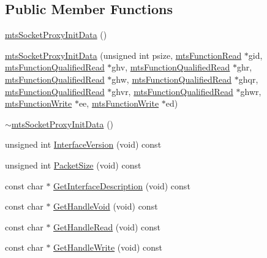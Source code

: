 \subsection*{Public Member Functions}
\begin{DoxyCompactItemize}
\item 
\hyperlink{classmts_socket_proxy_init_data_a0fa824a91dbd7cdf2aad73ef02278b48}{mts\+Socket\+Proxy\+Init\+Data} ()
\item 
\hyperlink{classmts_socket_proxy_init_data_ab4f9383394c2cf8bdf6044dda0af7242}{mts\+Socket\+Proxy\+Init\+Data} (unsigned int psize, \hyperlink{classmts_function_read}{mts\+Function\+Read} $\ast$gid, \hyperlink{classmts_function_qualified_read}{mts\+Function\+Qualified\+Read} $\ast$ghv, \hyperlink{classmts_function_qualified_read}{mts\+Function\+Qualified\+Read} $\ast$ghr, \hyperlink{classmts_function_qualified_read}{mts\+Function\+Qualified\+Read} $\ast$ghw, \hyperlink{classmts_function_qualified_read}{mts\+Function\+Qualified\+Read} $\ast$ghqr, \hyperlink{classmts_function_qualified_read}{mts\+Function\+Qualified\+Read} $\ast$ghvr, \hyperlink{classmts_function_qualified_read}{mts\+Function\+Qualified\+Read} $\ast$ghwr, \hyperlink{classmts_function_write}{mts\+Function\+Write} $\ast$ee, \hyperlink{classmts_function_write}{mts\+Function\+Write} $\ast$ed)
\item 
\hyperlink{classmts_socket_proxy_init_data_af07b95ffdb2c1dfc3abb1774d77e4fab}{$\sim$mts\+Socket\+Proxy\+Init\+Data} ()
\item 
unsigned int \hyperlink{classmts_socket_proxy_init_data_a4fbb4b7db870b1bdb4cb5c2494445398}{Interface\+Version} (void) const 
\item 
unsigned int \hyperlink{classmts_socket_proxy_init_data_ae338904222707e27cbf7fa2e71aa3896}{Packet\+Size} (void) const 
\item 
const char $\ast$ \hyperlink{classmts_socket_proxy_init_data_a5e51fb73ef660bebc91e97408038e469}{Get\+Interface\+Description} (void) const 
\item 
const char $\ast$ \hyperlink{classmts_socket_proxy_init_data_ac7b786d0024c84c4138e4ef7bb3e04f8}{Get\+Handle\+Void} (void) const 
\item 
const char $\ast$ \hyperlink{classmts_socket_proxy_init_data_a85e5ab435f2560d0537f43c68a372a9b}{Get\+Handle\+Read} (void) const 
\item 
const char $\ast$ \hyperlink{classmts_socket_proxy_init_data_ad82180bfeb45f5922885a902929122d7}{Get\+Handle\+Write} (void) const 
\item 

\end{DoxyCompactItemize}
